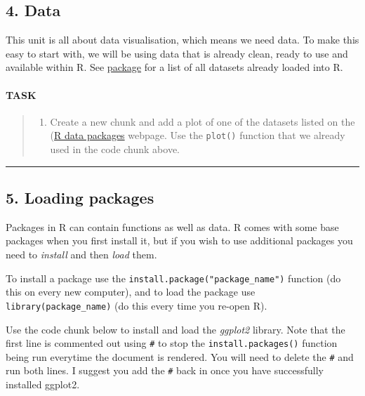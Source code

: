 \documentclass[]{article}
\providecommand{\tightlist}{%
  \setlength{\itemsep}{0pt}\setlength{\parskip}{0pt}}
\let\oldparagraph\paragraph
\renewcommand{\paragraph}[1]{\oldparagraph{#1}\mbox{}}
\begin{document}
\hypertarget{data}{%
\subsection{4. Data}\label{data}}

This unit is all about data visualisation, which means we need data. To
make this easy to start with, we will be using data that is already
clean, ready to use and available within R. See
\href{https://stat.ethz.ch/R-manual/R-devel/library/datasets/html/00Index.html}{package}
for a list of all datasets already loaded into R.

\hypertarget{task-2}{%
\paragraph{TASK}\label{task-2}}

\begin{quote}
\begin{enumerate}
\def\labelenumi{\arabic{enumi}.}
\setcounter{enumi}{4}
\tightlist
\item
  Create a new chunk and add a plot of one of the datasets listed on the
  (\href{https://stat.ethz.ch/R-manual/R-devel/library/datasets/html/00Index.html}{R
  data packages} webpage. Use the \texttt{plot()} function that we
  already used in the code chunk above.
\end{enumerate}
\end{quote}

\begin{center}\rule{0.5\linewidth}{\linethickness}\end{center}

\hypertarget{loading-packages}{%
\subsection{5. Loading packages}\label{loading-packages}}

Packages in R can contain functions as well as data. R comes with some
base packages when you first install it, but if you wish to use
additional packages you need to \emph{install} and then \emph{load}
them.

To install a package use the \texttt{install.package("package\_name")}
function (do this on every new computer), and to load the package use
\texttt{library(package\_name)} (do this every time you re-open R).

Use the code chunk below to install and load the \emph{ggplot2} library.
Note that the first line is commented out using \texttt{\#} to stop the
\texttt{install.packages()} function being run everytime the document is
rendered. You will need to delete the \texttt{\#} and run both lines. I
suggest you add the \texttt{\#} back in once you have successfully
installed ggplot2.
\end{document}
